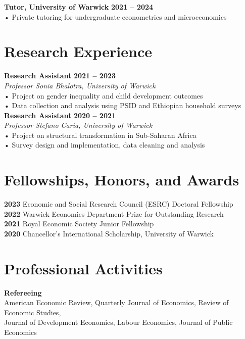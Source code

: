\documentclass[11pt,a4paper]{article}
\begin{document}
\textbf{Tutor, University of Warwick} \hfill \textbf{2021 -- 2024} \\
• Private tutoring for undergraduate econometrics and microeconomics \\

\section{Research Experience}
\textbf{Research Assistant} \hfill \textbf{2021 -- 2023} \\
\textit{Professor Sonia Bhalotra, University of Warwick} \\
• Project on gender inequality and child development outcomes \\
• Data collection and analysis using PSID and Ethiopian household surveys \\

\textbf{Research Assistant} \hfill \textbf{2020 -- 2021} \\
\textit{Professor Stefano Caria, University of Warwick} \\
• Project on structural transformation in Sub-Saharan Africa \\
• Survey design and implementation, data cleaning and analysis \\

\section{Fellowships, Honors, and Awards}
\textbf{2023} \quad Economic and Social Research Council (ESRC) Doctoral Fellowship \\
\textbf{2022} \quad Warwick Economics Department Prize for Outstanding Research \\
\textbf{2021} \quad Royal Economic Society Junior Fellowship \\
\textbf{2020} \quad Chancellor's International Scholarship, University of Warwick \\

\section{Professional Activities}
\textbf{Refereeing} \\
American Economic Review, Quarterly Journal of Economics, Review of Economic Studies, \\
Journal of Development Economics, Labour Economics, Journal of Public Economics \\
\end{document}
